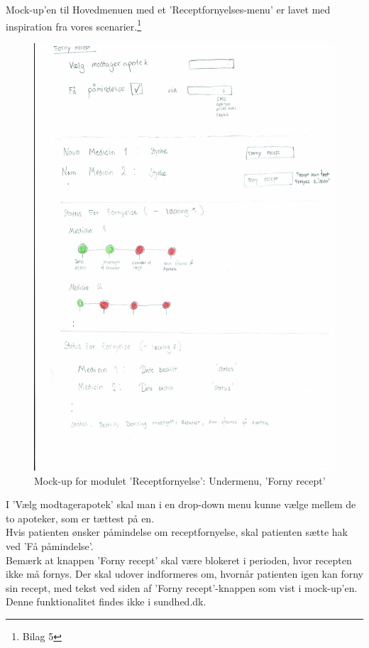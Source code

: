 Mock-up'en til Hovedmenuen med et 'Receptfornyelses-menu' er lavet med inspiration fra vores scenarier.\footnote{Bilag 5}
\begin{figure}[H]
	\centering
	\includegraphics[angle=0, width=\linewidth]{Materials/FornyRecept.pdf}
	\caption{Mock-up for modulet 'Receptfornyelse': Undermenu, 'Forny recept'}
	\label{fig:Mock-Up2}
\end{figure}
I 'Vælg modtagerapotek' skal man i en drop-down menu kunne vælge mellem de to apoteker, som er tættest på en.\\
Hvis patienten ønsker påmindelse om receptfornyelse, skal patienten sætte hak ved 'Få påmindelse'.\\
Bemærk at knappen 'Forny recept' skal være blokeret i perioden, hvor recepten ikke må fornys. Der skal udover indformeres om, hvornår patienten igen kan forny sin recept, med tekst ved siden af 'Forny recept'-knappen som vist i mock-up'en. Denne funktionalitet findes ikke i sundhed.dk.\\
